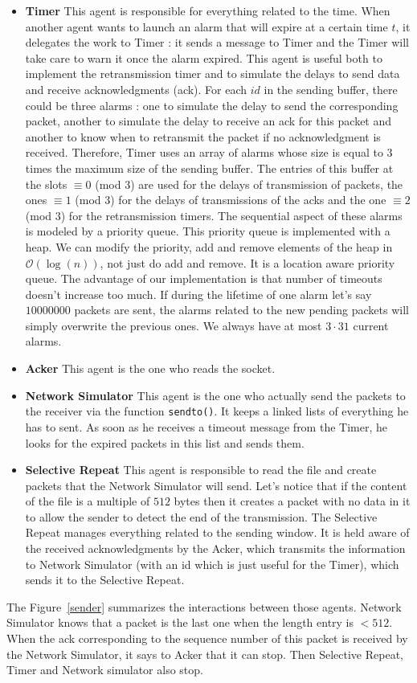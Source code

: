 \documentclass[11pt,a4paper]{article}
\begin{document}
\begin{itemize}
\item \textbf{Timer} This agent is responsible for everything related to the time. When another agent wants to launch an alarm that will expire at a certain time $t$, it delegates the work to Timer : it sends a message to Timer and the Timer will take care to warn it once the alarm expired. This agent is useful both to implement the retransmission timer and to simulate the delays to send data and receive acknowledgments (ack). For each $id$ in the sending buffer, there could be three alarms : one to simulate the delay to send the corresponding packet, another to simulate the delay to receive an ack for this packet and another to know when to retransmit the packet if no acknowledgment is received. Therefore, Timer uses an array of alarms whose size is equal to 3 times the maximum size of the sending buffer. The entries of this buffer at the slots $\equiv 0$ (mod $3$) are used for the delays of transmission of packets, the ones $\equiv 1$ (mod $3$) for the delays of transmissions of the acks and the one $\equiv 2$ (mod $3$) for the retransmission timers. The sequential aspect of these alarms is modeled by a priority queue. This priority queue is implemented with a heap. We can modify the priority, add and remove elements of the heap in $\mathcal{O}(\log(n))$, not just do add and remove. It is a location aware priority queue. The advantage of our implementation is that number of timeouts doesn't increase too much. If during the lifetime of one alarm let's say $10000000$ packets are sent, the alarms related to the new pending packets will simply overwrite the previous ones. We always have at most $3 \cdot 31$ current alarms.
\item \textbf{Acker} This agent is the one who reads the socket.
\item \textbf{Network Simulator} This agent is the one who actually send the packets to the receiver via the function \texttt{sendto()}. It keeps a linked lists of everything he has to sent. As soon as he receives a timeout message from the Timer, he looks for the expired packets in this list and sends them.
\item \textbf{Selective Repeat}  This agent is responsible to read the file and create packets that the Network Simulator will send. Let's notice that if the content of the file is a multiple of $512$ bytes then it creates a packet with no data in it to allow the sender to detect the end of the transmission. The Selective Repeat manages everything related to the sending window. It is held aware of the received acknowledgments by the Acker, which transmits the information to Network Simulator (with an id which is just useful for the Timer), which sends it to the Selective Repeat.
\end{itemize}
The Figure~\ref{sender} summarizes the interactions between those agents. Network Simulator knows that a packet is the last one when the length entry is $< 512$. When the ack corresponding to the sequence number of this packet is received by the Network Simulator, it says to Acker that it can stop. Then Selective Repeat, Timer and Network simulator also stop.
\end{document}
